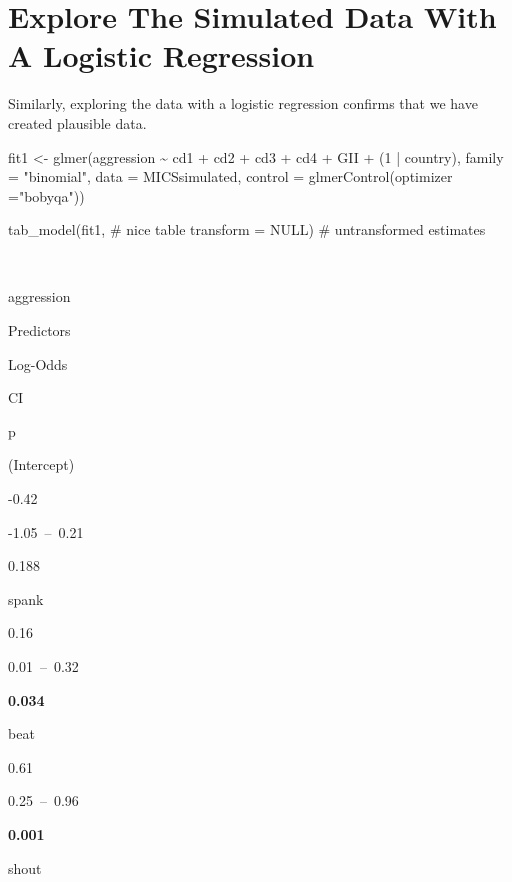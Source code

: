 \documentclass[
  letterpaper,
  DIV=11,
  numbers=noendperiod]{scrreprt}
\newenvironment{Shaded}{\begin{snugshade}}{\end{snugshade}}
\newcommand{\AttributeTok}[1]{\textcolor[rgb]{0.40,0.45,0.13}{#1}}
\newcommand{\CommentTok}[1]{\textcolor[rgb]{0.37,0.37,0.37}{#1}}
\newcommand{\ConstantTok}[1]{\textcolor[rgb]{0.56,0.35,0.01}{#1}}
\newcommand{\DecValTok}[1]{\textcolor[rgb]{0.68,0.00,0.00}{#1}}
\newcommand{\FunctionTok}[1]{\textcolor[rgb]{0.28,0.35,0.67}{#1}}
\newcommand{\NormalTok}[1]{\textcolor[rgb]{0.00,0.23,0.31}{#1}}
\newcommand{\OtherTok}[1]{\textcolor[rgb]{0.00,0.23,0.31}{#1}}
\newcommand{\SpecialCharTok}[1]{\textcolor[rgb]{0.37,0.37,0.37}{#1}}
\newcommand{\StringTok}[1]{\textcolor[rgb]{0.13,0.47,0.30}{#1}}
\begin{document}
\hypertarget{explore-the-simulated-data-with-a-logistic-regression}{%
\section{Explore The Simulated Data With A Logistic
Regression}\label{explore-the-simulated-data-with-a-logistic-regression}}

Similarly, exploring the data with a logistic regression confirms that
we have created plausible data.

\begin{Shaded}
\begin{Highlighting}[]
\NormalTok{fit1 }\OtherTok{\textless{}{-}} \FunctionTok{glmer}\NormalTok{(aggression }\SpecialCharTok{\textasciitilde{}}\NormalTok{ cd1 }\SpecialCharTok{+}\NormalTok{ cd2 }\SpecialCharTok{+}\NormalTok{ cd3 }\SpecialCharTok{+}\NormalTok{ cd4 }\SpecialCharTok{+}\NormalTok{ GII }\SpecialCharTok{+}
\NormalTok{                (}\DecValTok{1} \SpecialCharTok{|}\NormalTok{ country), }
              \AttributeTok{family =} \StringTok{"binomial"}\NormalTok{,}
              \AttributeTok{data =}\NormalTok{ MICSsimulated,}
              \AttributeTok{control =} \FunctionTok{glmerControl}\NormalTok{(}\AttributeTok{optimizer =}\StringTok{"bobyqa"}\NormalTok{))}

\FunctionTok{tab\_model}\NormalTok{(fit1, }\CommentTok{\# nice table}
          \AttributeTok{transform =} \ConstantTok{NULL}\NormalTok{) }\CommentTok{\# untransformed estimates}
\end{Highlighting}
\end{Shaded}

~

aggression

Predictors

Log-Odds

CI

p

(Intercept)

-0.42

-1.05~--~0.21

0.188

spank

0.16

0.01~--~0.32

\textbf{0.034}

beat

0.61

0.25~--~0.96

\textbf{0.001}

shout
\end{document}

